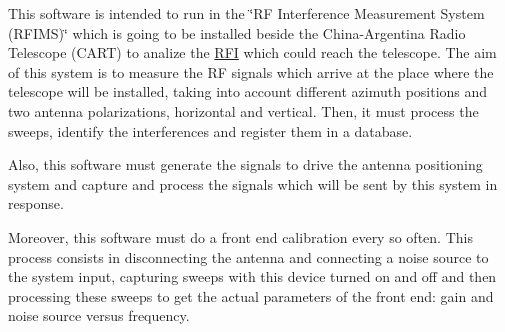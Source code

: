 This software is intended to run in the \char`\"{}\+R\+F Interference Measurement System (\+R\+F\+I\+M\+S)\char`\"{} which is going to be installed beside the China-\/\+Argentina Radio Telescope (C\+A\+RT) to analize the \hyperlink{structRFI}{R\+FI} which could reach the telescope. The aim of this system is to measure the RF signals which arrive at the place where the telescope will be installed, taking into account different azimuth positions and two antenna polarizations, horizontal and vertical. Then, it must process the sweeps, identify the interferences and register them in a database.

Also, this software must generate the signals to drive the antenna positioning system and capture and process the signals which will be sent by this system in response.

Moreover, this software must do a front end calibration every so often. This process consists in disconnecting the antenna and connecting a noise source to the system input, capturing sweeps with this device turned on and off and then processing these sweeps to get the actual parameters of the front end\+: gain and noise source versus frequency. 
